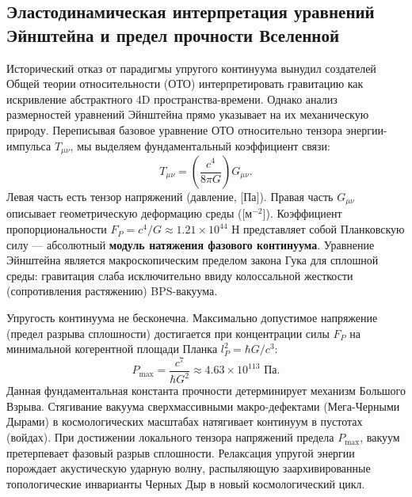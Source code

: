 \documentclass[12pt,a4paper]{article}
\begin{document}
\subsection{Эластодинамическая интерпретация уравнений Эйнштейна и предел прочности Вселенной}
Исторический отказ от парадигмы упругого континуума вынудил создателей Общей теории относительности (ОТО) интерпретировать гравитацию как искривление абстрактного 4D пространства-времени. Однако анализ размерностей уравнений Эйнштейна прямо указывает на их механическую природу.
Переписывая базовое уравнение ОТО относительно тензора энергии-импульса $T_{\mu\nu}$, мы выделяем фундаментальный коэффициент связи:
\begin{equation}
	T_{\mu\nu} = \left( \frac{c^4}{8\pi G} \right) G_{\mu\nu}.
\end{equation}
Левая часть есть тензор напряжений (давление, [Па]). Правая часть $G_{\mu\nu}$ описывает геометрическую деформацию среды ([м$^{-2}$]). Коэффициент пропорциональности $F_P = c^4/G \approx 1.21 \times 10^{44}$ Н представляет собой Планковскую силу — абсолютный \textbf{модуль натяжения фазового континуума}. Уравнение Эйнштейна является макроскопическим пределом закона Гука для сплошной среды: гравитация слаба исключительно ввиду колоссальной жесткости (сопротивления растяжению) BPS-вакуума.

Упругость континуума не бесконечна. Максимально допустимое напряжение (предел разрыва сплошности) достигается при концентрации силы $F_P$ на минимальной когерентной площади Планка $l_P^2 = \hbar G/c^3$:
\begin{equation}
	P_{\text{max}} = \frac{c^7}{\hbar G^2} \approx 4.63 \times 10^{113} \text{ Па}.
\end{equation}
Данная фундаментальная константа прочности детерминирует механизм Большого Взрыва. Стягивание вакуума сверхмассивными макро-дефектами (Мега-Черными Дырами) в космологических масштабах натягивает континуум в пустотах (войдах). При достижении локального тензора напряжений предела $P_{\text{max}}$, вакуум претерпевает фазовый разрыв сплошности. Релаксация упругой энергии порождает акустическую ударную волну, распыляющую заархивированные топологические инварианты Черных Дыр в новый космологический цикл.
\end{document}
